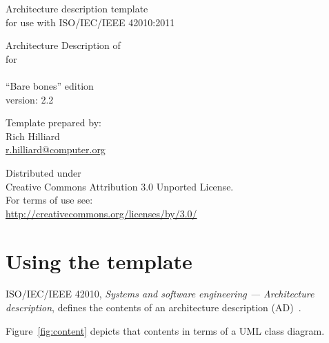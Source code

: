 \documentclass[10pt,oneside]{report}
\begin{document}
\begin{titlepage}

\begin{center}
\HRule

\Large\textmd{Architecture description template \\
  for use with ISO/IEC/IEEE 42010:2011}
\vfill

{ \huge{Architecture Description of \\ 
     for \\
    }} \\[0.4cm]

\large\textmd{``Bare bones'' edition}\\
\large\textmd{version: 2.2}
\vfill

Template prepared by: \\
\large\textsf{Rich Hilliard \\
  \href{mailto:r.hilliard@computer.org}{r.hilliard@computer.org}}

\vfill
Distributed under \\
Creative Commons Attribution 3.0 Unported License. \\
For terms of use see:  \\ 
\url{http://creativecommons.org/licenses/by/3.0/}

\HRule
\end{center}
\end{titlepage}


\setcounter{tocdepth}{3}


\chapter*{Using the template}

ISO/IEC/IEEE 42010, \textit{Systems and software engineering ---
  Architecture description}, defines the contents of an architecture
description (AD)~\cite{ISO42010:2011}. 

Figure~\ref{fig:content} depicts that contents in terms of a UML class
diagram.
\end{document}
